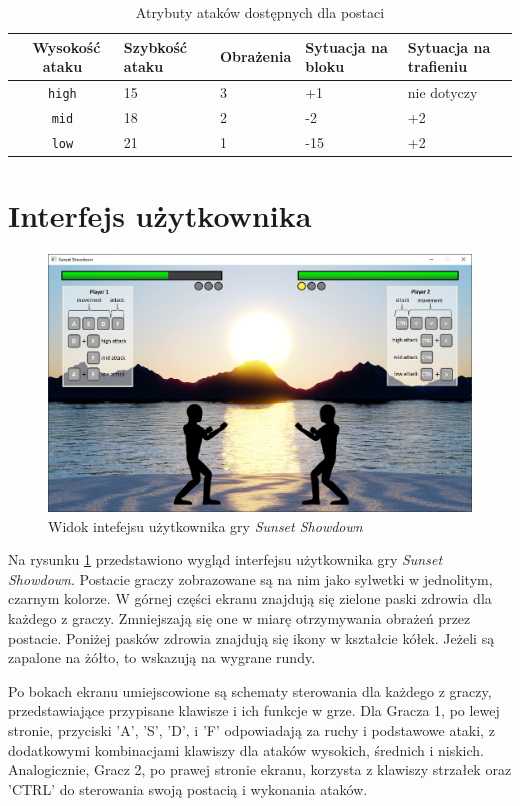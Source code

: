 \begin{table}[htb] \small
\centering
\caption{Atrybuty ataków dostępnych dla postaci}
\label{tab:ataki}
\begin{tabularx}{\linewidth}{|c|X|X|X|X|} \hline\
Wysokość ataku & Szybkość ataku & Obrażenia & Sytuacja na bloku & Sytuacja na trafieniu \\ \hline\hline
\texttt{high} & 15 & 3 & +1 & nie dotyczy \\ \hline
\texttt{mid} & 18 & 2 & -2 & +2\\ \hline
\texttt{low} & 21 & 1 & -15 & +2\\ \hline
\end{tabularx}
\end{table}

\section{Interfejs użytkownika}
\begin{figure}
	\centering
		\includegraphics[width=0.64\linewidth]{rys02/interfejs}
	\caption{Widok intefejsu użytkownika gry \emph{Sunset Showdown}}
	\label{fig:interfejs}
\end{figure}
Na rysunku \ref{fig:interfejs} przedstawiono wygląd interfejsu użytkownika gry \emph{Sunset Showdown}. Postacie graczy zobrazowane są na nim jako sylwetki w jednolitym, czarnym kolorze. W górnej części ekranu znajdują się zielone paski zdrowia dla każdego z graczy. Zmniejszają się one w miarę otrzymywania obrażeń przez postacie. Poniżej pasków zdrowia znajdują się ikony w kształcie kółek. Jeżeli są zapalone na żółto, to wskazują na wygrane rundy.

Po bokach ekranu umiejscowione są schematy sterowania dla każdego z graczy, przedstawiające przypisane klawisze i ich funkcje w grze. Dla Gracza 1, po lewej stronie, przyciski 'A', 'S', 'D', i 'F' odpowiadają za ruchy i podstawowe ataki, z dodatkowymi kombinacjami klawiszy dla ataków wysokich, średnich i niskich. Analogicznie, Gracz 2, po prawej stronie ekranu, korzysta z klawiszy strzałek oraz 'CTRL' do sterowania swoją postacią i wykonania ataków.

